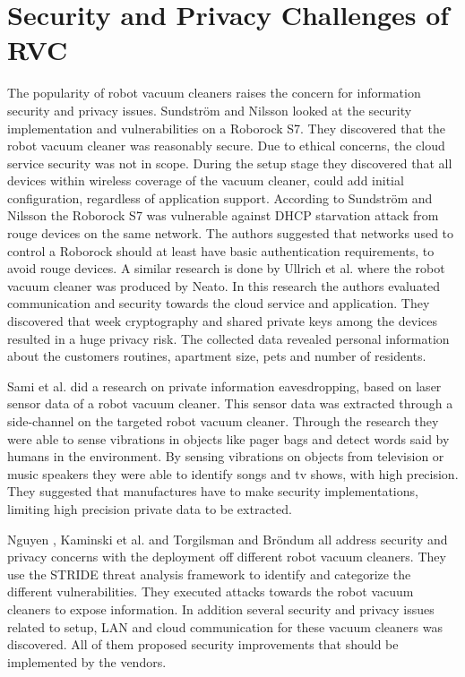 \section{Security and Privacy Challenges of RVC}
The popularity of robot vacuum cleaners raises the concern for information security and privacy issues. Sundström and Nilsson \cite{Roborockvulnerability} looked at the security implementation and vulnerabilities on a Roborock S7. They discovered that the robot vacuum cleaner was reasonably secure. Due to ethical concerns, the cloud service security was not in scope. During the setup stage they discovered that all devices within wireless coverage of the vacuum cleaner, could add initial configuration, regardless of application support. According to Sundström and Nilsson \cite{Roborockvulnerability} the Roborock S7 was vulnerable against DHCP starvation attack from rouge devices on the same network. The authors suggested that networks used to control a Roborock should at least have basic authentication requirements, to avoid rouge devices. 
A similar research is done by Ullrich et al. \cite{Neato} where the robot vacuum cleaner was produced by Neato. In this research the authors evaluated communication and security towards the cloud service and application. They discovered that week cryptography and shared private keys among the devices resulted in a huge privacy risk. The collected data revealed personal information about the customers routines, apartment size, pets and number of residents. 

Sami et al. \cite{lindaeavesdropping} did a research on private information eavesdropping, based on laser sensor data of a robot vacuum cleaner.  This sensor data was extracted through a side-channel on the targeted robot vacuum cleaner. Through the research they were able to sense vibrations in objects like pager bags and detect words said by humans in the environment. By sensing vibrations on objects from television or music speakers they were able to identify songs and tv shows, with high precision. They suggested that manufactures have to make security implementations, limiting high precision private data to be extracted.

Nguyen \cite{robotvacuum_voulne_nguyendeep}, Kaminski et al. \cite{robotvacuum_voulne1_kaminski2016averting} and Torgilsman and Bröndum \cite{robotvacuum_voulne2_torgilsman2020ethical} all address security and privacy concerns with the deployment off different robot vacuum cleaners. They use the STRIDE threat analysis framework to identify and categorize the different vulnerabilities. They executed attacks towards the robot vacuum cleaners to expose information. In addition several security and privacy issues related to setup, LAN and cloud communication for these vacuum cleaners was discovered. All of them proposed security improvements that should be implemented by the vendors. 

